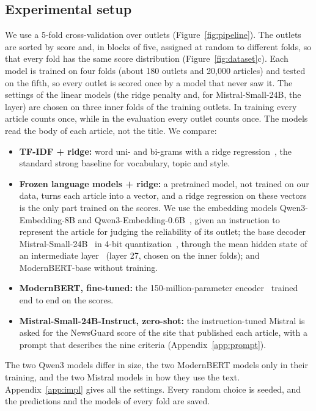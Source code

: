 \documentclass[11pt,a4paper]{article}
\begin{document}
\subsection{Experimental setup}\label{sec:setup}
We use a 5-fold cross-validation over outlets (Figure~\ref{fig:pipeline}). The outlets are sorted by score and, in
blocks of five, assigned at random to different folds, so that every fold has the same score distribution
(Figure~\ref{fig:dataset}c). Each model is trained on four folds (about 180 outlets and 20,000 articles) and tested on
the fifth, so every outlet is scored once by a model that never saw it. The settings of the linear models (the ridge
penalty and, for Mistral-Small-24B, the layer) are chosen on three inner folds of the training outlets. In training every
article counts once, while in the evaluation every outlet counts once. The models read the body of each article, not the
title. We compare:
\begin{itemize}
  \item \textbf{TF-IDF + ridge:} word uni- and bi-grams with a ridge regression~\cite{hoerl1970ridge}, the standard
        strong baseline for vocabulary, topic and style.
  \item \textbf{Frozen language models + ridge:} a pretrained model, not trained on our data, turns each article into a
        vector, and a ridge regression on these vectors is the only part trained on the scores. We use the embedding
        models Qwen3-Embedding-8B and Qwen3-Embedding-0.6B~\cite{zhang2025qwen3}, given an instruction to represent the
        article for judging the reliability of its outlet; the base decoder Mistral-Small-24B~\cite{mistralsmall} in
        4-bit quantization~\cite{dettmers2023qlora}, through the mean hidden state of an intermediate
        layer~\cite{skean2025layer} (layer 27, chosen on the inner folds); and ModernBERT-base without training.
  \item \textbf{ModernBERT, fine-tuned:} the 150-million-parameter encoder~\cite{warner2024modernbert} trained end to end
        on the scores.
  \item \textbf{Mistral-Small-24B-Instruct, zero-shot:} the instruction-tuned Mistral is asked for the NewsGuard score of
        the site that published each article, with a prompt that describes the nine criteria (Appendix~\ref{app:prompt}).
\end{itemize}
The two Qwen3 models differ in size, the two ModernBERT models only in their training, and the two Mistral models in how
they use the text. Appendix~\ref{app:impl} gives all the settings. Every random choice is seeded, and the
predictions and the models of every fold are saved.
\end{document}
